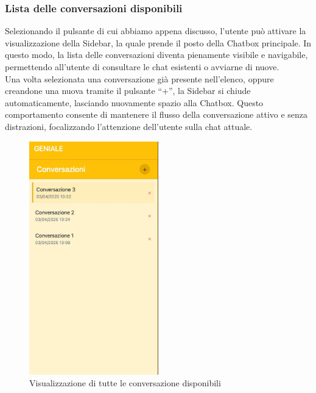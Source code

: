 \subsubsection{Lista delle conversazioni disponibili}
Selezionando il pulsante di cui abbiamo appena discusso, l’utente può attivare la visualizzazione della Sidebar, la quale prende il posto della Chatbox principale. In questo modo, la lista delle conversazioni diventa pienamente visibile e navigabile, permettendo all’utente di consultare le chat esistenti o avviarne di nuove. \\
Una volta selezionata una conversazione già presente nell’elenco, oppure creandone una nuova tramite il pulsante “+”, la Sidebar si chiude automaticamente, lasciando nuovamente spazio alla Chatbox. Questo comportamento consente di mantenere il flusso della conversazione attivo e senza distrazioni, focalizzando l’attenzione dell’utente sulla chat attuale.
\begin{figure}[H]
\centering
\includegraphics[width=0.5\textwidth]{contents/img/list_conv_mobile.jpg}
\caption{Visualizzazione di tutte le conversazione disponibili}
\end{figure}

